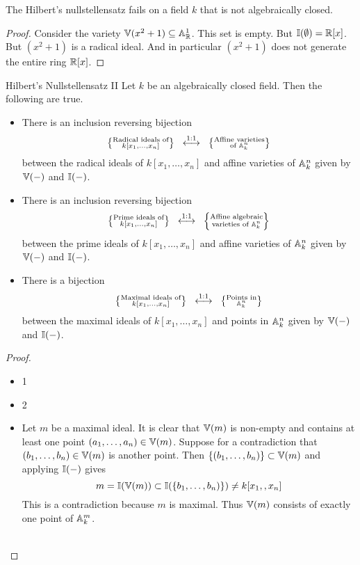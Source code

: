 \documentclass[a4paper]{article}
\begin{document}
\begin{eg}{}{} The Hilbert's nullstellensatz fails on a field $k$ that is not algebraically closed. \tcbline
\begin{proof}
Consider the variety $\mathbb{V}(x^2+1)\subseteq\mathbb{A}_{\mathbb{R}}^1$. This set is empty. But $\mathbb{I}(\emptyset)=\mathbb{R}[x]$. But $(x^2+1)$ is a radical ideal. And in particular $(x^2+1)$ does not generate the entire ring $\mathbb{R}[x]$. 
\end{proof}
\end{eg}

\begin{thm}{Hilbert's Nullstellensatz II}{} Let $k$ be an algebraically closed field. Then the following are true. 
\begin{itemize}
\item There is an inclusion reversing bijection $$\left\{\substack{\text{Radical ideals of}\\ k[x_1,\dots,x_n]}\right\}\;\;\overset{\text{1:1}}{\longleftrightarrow}\;\;\left\{\substack{\text{Affine varieties}\\\text{of }\mathbb{A}_k^n}\right\}$$ between the radical ideals of $k[x_1,\dots,x_n]$ and affine varieties of $\mathbb{A}_k^n$ given by $\mathbb{V}(-)$ and $\mathbb{I}(-)$. 
\item There is an inclusion reversing bijection $$\left\{\substack{\text{Prime ideals of}\\ k[x_1,\dots,x_n]}\right\}\;\;\overset{\text{1:1}}{\longleftrightarrow}\;\;\left\{\substack{\text{Affine algebraic}\\\text{varieties of }\mathbb{A}_k^n}\right\}$$ between the prime ideals of $k[x_1,\dots,x_n]$ and affine varieties of $\mathbb{A}_k^n$ given by $\mathbb{V}(-)$ and $\mathbb{I}(-)$. 
\item There is a bijection $$\left\{\substack{\text{Maximal ideals of}\\ k[x_1,\dots,x_n]}\right\}\;\;\overset{\text{1:1}}{\longleftrightarrow}\;\;\left\{\substack{\text{Points in}\\\mathbb{A}_k^n}\right\}$$ between the maximal ideals of $k[x_1,\dots,x_n]$ and points in $\mathbb{A}_k^n$ given by $\mathbb{V}(-)$ and $\mathbb{I}(-)$. 
\end{itemize} \tcbline
\begin{proof}~\\
\begin{itemize}
\item 1
\item 2
\item Let $m$ be a maximal ideal. It is clear that $\mathbb{V}(m)$ is non-empty and contains at least one point $(a_1,\dots,a_n)\in\mathbb{V}(m)$. Suppose for a contradiction that $(b_1,\dots,b_n)\in\mathbb{V}(m)$ is another point. Then $\{(b_1,\dots,b_n)\}\subset\mathbb{V}(m)$ and applying $\mathbb{I}(-)$ gives $$m=\I(\V(m))\subset\I(\{b_1,\dots,b_n)\})\neq k[x_1,\do,x_n]$$ This is a contradiction because $m$ is maximal. Thus $\mathbb{V}(m)$ consists of exactly one point of $\mathbb{A}_k^m$. \\~\\


\end{itemize}
\end{proof}
\end{thm}
\end{document}
